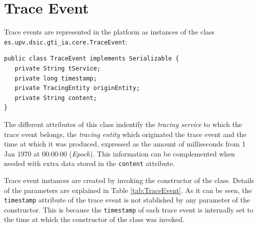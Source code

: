 %
%
%
%

\section{Trace Event}\label{sec:tEvent}

	Trace events are represented in the platform as instances of the class
	\lstinline{es.upv.dsic.gti_ia.core.TraceEvent}:

	\begin{lstlisting}
public class TraceEvent implements Serializable {
   private String tService;
   private long timestamp;
   private TracingEntity originEntity;
   private String content;
}
	\end{lstlisting}

	The different attributes of this class indentify the \textit{tracing service} to which the trace event
	belongs, the \textit{tracing entity} which originated the trace event and the time at which it was
	produced, expressed as the amount of milliseconds from 1 Jan 1970 at 00:00:00 (\textit{Epoch}).
	This information can be complemented when needed with extra data stored in the
	\texttt{content} attribute.

	Trace event instances are created by invoking the constructor of the class. Details of the parameters
	are explained in Table \ref{tab:TraceEvent}. As it can be seen, the \texttt{timestamp} attribute of the
	trace event is not stablished by any parameter of the constructor. This is because the
	\texttt{timestamp} of each trace event is internally set to the time at which the constructor of the class
	was invoked.

